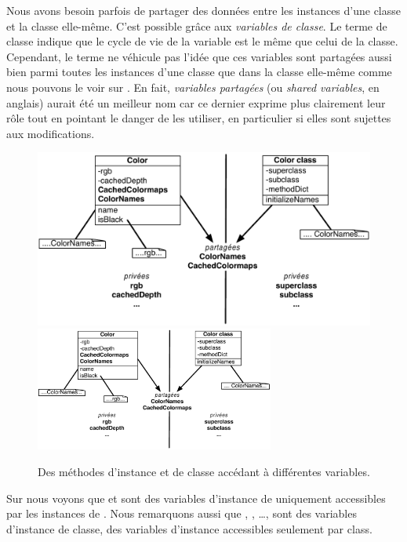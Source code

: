 \documentclass[a4paper,10pt,twoside]{book}
\begin{document}
Nous avons besoin parfois de partager des donn\'ees entre les instances d'une classe et la classe elle-m\^eme.
C'est possible gr\^ace aux \emph{variables de classe}. 
Le terme  de classe indique que le cycle de vie
de la variable est le m\^eme que celui de la classe. Cependant, 
le terme ne v\'ehicule pas l'id\'ee que ces variables sont partag\'ees aussi bien parmi toutes
les instances d'une classe que dans la classe elle-m\^eme comme nous pouvons le voir sur .
En fait, \emph{variables partag\'ees} (ou \emph{shared variables}, en anglais) aurait
\'et\'e un meilleur nom car ce dernier exprime plus clairement leur r\^ole
tout en pointant le danger de les utiliser, en particulier si elles sont 
sujettes aux modifications.

\begin{figure}[htb]
\begin{center}
\ifluluelse
	{\includegraphics[width=\textwidth]{privateSharedVarColor}}
	{\includegraphics[width=0.7\textwidth]{privateSharedVarColor}}
\caption{Des m\'ethodes d'instance et de classe acc\'edant \`a diff\'erentes
variables.\label{fig:privateSharedVar}}
\end{center}
\end{figure}

Sur  nous voyons que  et  sont
des variables d'instance de  uniquement accessibles par les 
instances de .
Nous remarquons aussi que , , \ldots \etc, sont des variables d'instance de classe, \ie des variables d'instance  accessibles seulement par  class.
\end{document}
